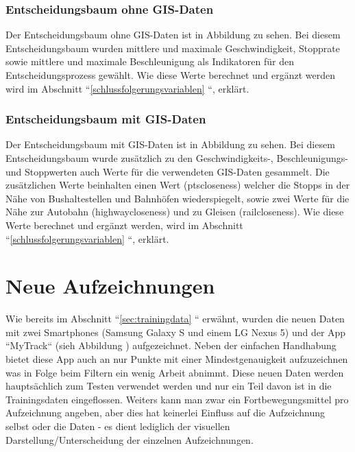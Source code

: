 
\subsubsection{Entscheidungsbaum ohne GIS-Daten}
\label{entscheidungsbaum}
Der Entscheidungsbaum ohne GIS-Daten ist in Abbildung  zu sehen. Bei diesem Entscheidungsbaum wurden mittlere und maximale Geschwindigkeit, Stopprate sowie mittlere und maximale Beschleunigung als Indikatoren für den Entscheidungsprozess gewählt. Wie diese Werte berechnet und ergänzt werden wird im Abschnitt ``\ref {schlussfolgerungsvariablen}  ``, erklärt. 

\clearpage

\subsubsection{Entscheidungsbaum mit GIS-Daten}
\label{entscheidungsbaumGIS}
Der Entscheidungsbaum mit GIS-Daten ist in Abbildung  zu sehen. Bei diesem Entscheidungsbaum wurde zusätzlich zu den Geschwindigkeits-, Beschleunigungs- und Stoppwerten auch Werte für die verwendeten GIS-Daten gesammelt. Die zusätzlichen Werte beinhalten einen Wert (ptscloseness) welcher die Stopps in der Nähe von Bushaltestellen und Bahnhöfen wiederspiegelt, sowie zwei Werte für die Nähe zur Autobahn (highwaycloseness) und zu Gleisen (railcloseness). Wie diese Werte berechnet und ergänzt werden, wird im Abschnitt ``\ref{schlussfolgerungsvariablen} ``, erklärt.

\clearpage

\section{Neue Aufzeichnungen}
Wie bereits im Abschnitt ``\ref{sec:trainingdata} `` erwähnt, wurden die neuen Daten mit zwei Smartphones (Samsung Galaxy S und einem LG Nexus 5) und der App ``MyTrack`` (sieh Abbildung ) aufgezeichnet. Neben der einfachen Handhabung bietet diese App auch an nur Punkte mit einer Mindestgenauigkeit aufzuzeichnen was in Folge beim Filtern ein wenig Arbeit abnimmt. Diese neuen Daten werden hauptsächlich zum Testen verwendet werden und nur ein Teil davon ist in die Trainingsdaten eingeflossen. Weiters kann man zwar ein Fortbewegungsmittel pro Aufzeichnung angeben, aber dies hat keinerlei Einfluss auf die Aufzeichnung selbst oder die Daten - es dient lediglich der visuellen Darstellung/Unterscheidung der einzelnen Aufzeichnungen.

